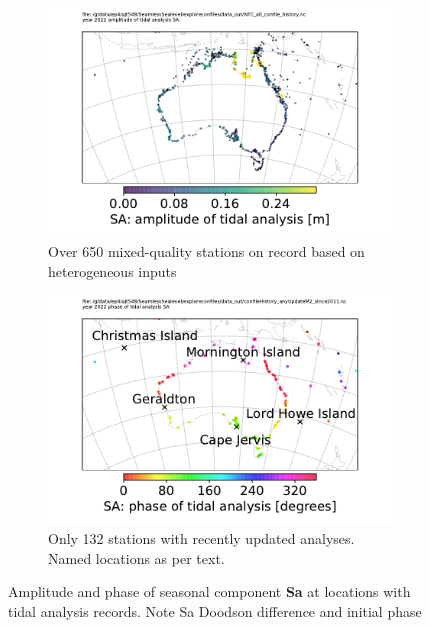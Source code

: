 \begin{figure}[H]\centering
    \begin{subfigure}[b]{\figwidthHalf}
        \includegraphics[trim={0 0 0 1cm},clip,width=\textwidth]{figures/maps/locations_SaAmp.pdf} 
        \caption{Over 650 mixed-quality stations on record based on heterogeneous inputs}
    \end{subfigure}
    
    \begin{subfigure}[b]{\figwidthHalf}
        \includegraphics[trim={0 0 0 1cm},clip,width=\textwidth]{figures/maps/locations_SaPhaAnyM2Update.pdf} 
        \caption{Only 132 stations with recently updated analyses. Named locations as per text.}
    \end{subfigure}
    \caption{Amplitude and phase of seasonal component \textbf{Sa} at locations with tidal analysis records.  Note Sa Doodson difference and initial phase \citep[10.4]{PCTMSL-sp9}}
    \label{fig:SaAmp}
\end{figure}   

